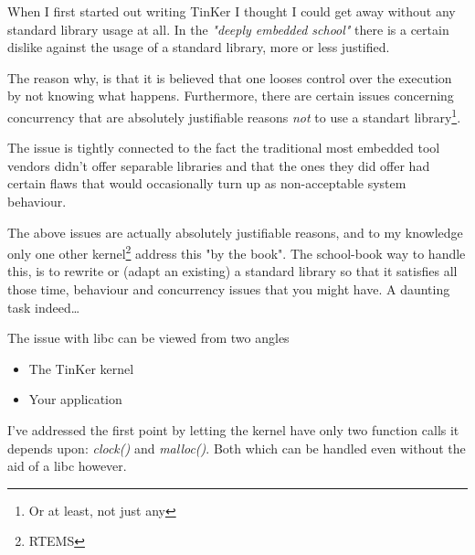 When I first started out writing TinKer I thought I could get away without any standard library usage at all. In the \textit{"deeply embedded school"} there is a certain dislike against the usage of a standard library, more or less justified.

The reason why, is that it is believed that one looses control over the execution by not knowing what happens. Furthermore, there are certain issues concerning concurrency that are absolutely justifiable reasons \textit{not} to use a standart library\footnote{Or at least, not just any}.

The issue is tightly connected to the fact the traditional most embedded tool vendors didn't offer separable libraries and that the ones they did offer had certain flaws that would occasionally turn up as non-acceptable system behaviour.

The above issues are actually absolutely justifiable reasons, and to my knowledge only one other kernel\footnote{RTEMS} address this "by the book". The school-book way to handle this, is to rewrite or (adapt an existing) a standard library so that it satisfies all those time, behaviour and concurrency issues that you might have. A daunting task indeed\ldots

The issue with libc can be viewed from two angles
\begin{itemize}
	\item The TinKer kernel
	\item Your application
\end{itemize}
I've addressed the first point by letting the kernel have only two function calls it depends upon: \textit{clock()} and \textit{malloc()}. Both which can be handled even without the aid of a libc however.

